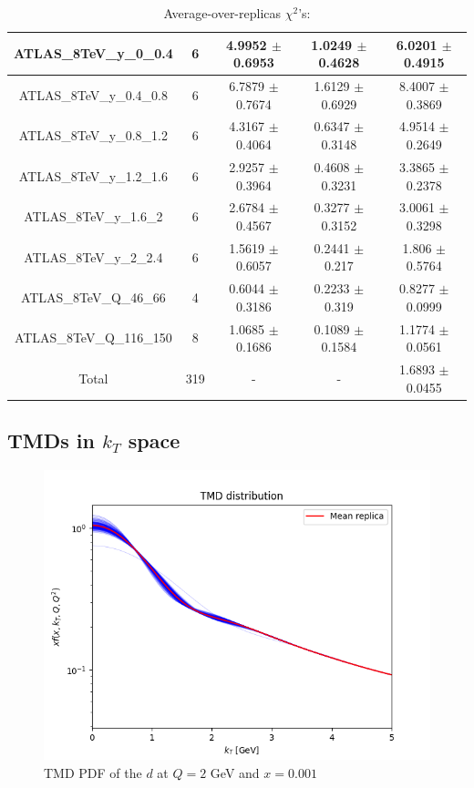 \documentclass[
]{article}
\begin{document}
\begin{table}[h]
\begin{tabular}{|c|c|c|c|c|}
ATLAS\_8TeV\_y\_0\_0.4 & 6 & 4.9952 \(\pm\) 0.6953 & 1.0249 \(\pm\)
0.4628 & 6.0201 \(\pm\) 0.4915 \\ \hline
ATLAS\_8TeV\_y\_0.4\_0.8 & 6 & 6.7879 \(\pm\) 0.7674 & 1.6129 \(\pm\)
0.6929 & 8.4007 \(\pm\) 0.3869 \\ \hline
ATLAS\_8TeV\_y\_0.8\_1.2 & 6 & 4.3167 \(\pm\) 0.4064 & 0.6347 \(\pm\)
0.3148 & 4.9514 \(\pm\) 0.2649 \\ \hline
ATLAS\_8TeV\_y\_1.2\_1.6 & 6 & 2.9257 \(\pm\) 0.3964 & 0.4608 \(\pm\)
0.3231 & 3.3865 \(\pm\) 0.2378 \\ \hline
ATLAS\_8TeV\_y\_1.6\_2 & 6 & 2.6784 \(\pm\) 0.4567 & 0.3277 \(\pm\)
0.3152 & 3.0061 \(\pm\) 0.3298 \\ \hline
ATLAS\_8TeV\_y\_2\_2.4 & 6 & 1.5619 \(\pm\) 0.6057 & 0.2441 \(\pm\)
0.217 & 1.806 \(\pm\) 0.5764 \\ \hline
ATLAS\_8TeV\_Q\_46\_66 & 4 & 0.6044 \(\pm\) 0.3186 & 0.2233 \(\pm\)
0.319 & 0.8277 \(\pm\) 0.0999 \\ \hline
ATLAS\_8TeV\_Q\_116\_150 & 8 & 1.0685 \(\pm\) 0.1686 & 0.1089 \(\pm\)
0.1584 & 1.1774 \(\pm\) 0.0561 \\ \hline
Total & 319 & - & - & 1.6893 \(\pm\) 0.0455 \\ \hline

\end{tabular}

\caption{Average-over-replicas \(\chi^2\)'s:}

\end{table}

\hypertarget{tmds-in-k_t-space}{%
\subsection{\texorpdfstring{TMDs in \(k_T\)
space}{TMDs in k\_T space}}\label{tmds-in-k_t-space}}

\begin{figure}
\centering
\includegraphics{pngplots/tmd_1_2_0.001.png}
\caption{TMD PDF of the \(d\) at \(Q = 2\) GeV and \(x = 0.001\)}
\end{figure}
\end{document}
